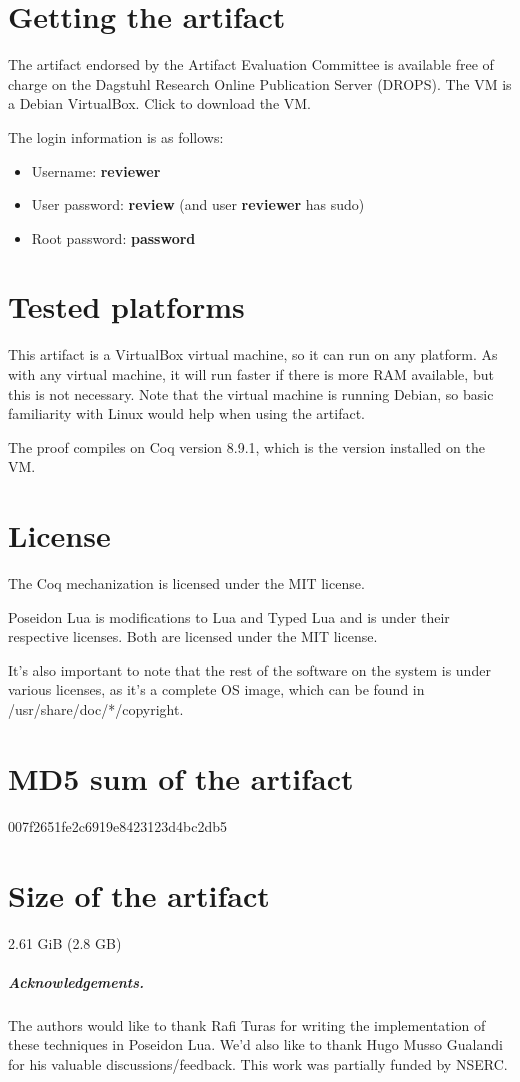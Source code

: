 \documentclass[a4paper,UKenglish]{darts-v2019}
\newenvironment{getting}{\section{Getting the artifact} The artifact 
endorsed by the Artifact Evaluation Committee is available free of 
charge on the Dagstuhl Research Online Publication Server (DROPS).}{}
\newenvironment{platforms}{\section{Tested platforms}}{}
\newcommand{\license}[1]{{\section{License}#1}}
\newcommand{\mdsum}[1]{{\section{MD5 sum of the artifact}#1}}
\newcommand{\artifactsize}[1]{{\section{Size of the artifact}#1}}
\begin{document}
\begin{getting}
The VM is a Debian VirtualBox.
Click
\href{https://drive.google.com/file/d/1NkZr-Dx7RmCuISKGdry1fyTG0lXYovxR/view?usp=sharing}{\textbf{\color{blue}{here}}}
to download the VM.

The login information is as follows:
\begin{itemize}
    \item Username: {\bf reviewer}
    \item User password: {\bf review} (and user {\bf reviewer} has sudo)
    \item Root password: {\bf password}
\end{itemize}
\end{getting}

\begin{platforms}
This artifact is a VirtualBox virtual machine, so it can run on any platform.
As with any virtual machine, it will run faster if there is more RAM available, but this is not necessary.
Note that the virtual machine is running Debian, so basic familiarity with Linux would help when using the artifact.

The proof compiles on Coq version 8.9.1, which is the version installed on the VM.
\end{platforms}

\license{The Coq mechanization is licensed under the MIT license.

Poseidon Lua is modifications to Lua and Typed Lua and is under their respective licenses. Both are licensed under the MIT license.

It's also important to note that the rest of the software on the system is under various licenses, as it's a complete OS image, which can be found in /usr/share/doc/*/copyright.}

\mdsum{007f2651fe2c6919e8423123d4bc2db5}

\artifactsize{2.61 GiB (2.8 GB)}

\subparagraph*{Acknowledgements.}

The authors would like to thank Rafi Turas for writing the implementation of these techniques in Poseidon Lua. 
We’d also like to thank Hugo Musso Gualandi for his valuable discussions/feedback. This work was partially funded by NSERC.
\end{document}
